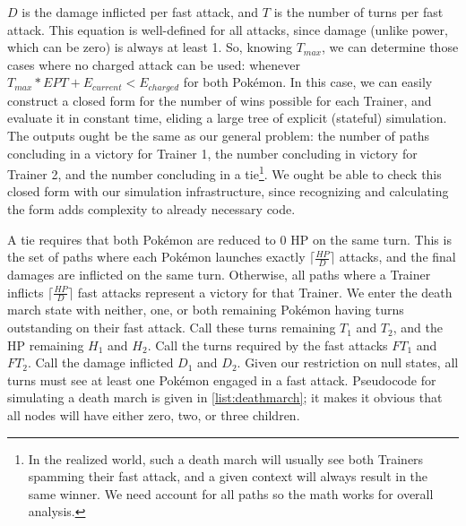 $D$ is the damage inflicted per fast attack, and $T$ is the number of turns per fast attack.
This equation is well-defined for all attacks, since damage (unlike power,
  which can be zero) is always at least 1.
So, knowing $T_{max}$, we can determine those cases where no charged attack
  can be used: whenever $T_{max} * EPT + E_{current} < E_{charged}$ for both Pokémon.
In this case, we can easily construct a closed form for the number of wins
  possible for each Trainer, and evaluate it in constant time, eliding
  a large tree of explicit (stateful) simulation.
The outputs ought be the same as our general problem: the number of paths
  concluding in a victory for Trainer 1, the number concluding in victory for
  Trainer 2, and the number concluding in a tie\footnote{In the realized world,
  such a death march will usually see both Trainers spamming their fast attack,
  and a given context will always result in the same winner. We need account
  for all paths so the math works for overall analysis.}.
We ought be able to check this closed form with our simulation infrastructure,
  since recognizing and calculating the form adds complexity to
  already necessary code.

A tie requires that both Pokémon are reduced to 0 HP on the same turn.
This is the set of paths where each Pokémon launches exactly $\lceil\frac{HP}{D}\rceil$
  attacks, and the final damages are inflicted on the same turn.
Otherwise, all paths where a Trainer inflicts $\lceil\frac{HP}{D}\rceil$ fast attacks
  represent a victory for that Trainer.
We enter the death march state with neither, one, or both remaining Pokémon having
  turns outstanding on their fast attack.
Call these turns remaining $T_1$ and $T_2$, and the HP remaining $H_1$ and $H_2$.
Call the turns required by the fast attacks $FT_1$ and $FT_2$.
Call the damage inflicted $D_1$ and $D_2$.
Given our restriction on null states, all turns must see at least one Pokémon engaged
  in a fast attack.
Pseudocode for simulating a death march is given in \autoref{list:deathmarch}; it
  makes it obvious that all nodes will have either zero, two, or three children.

